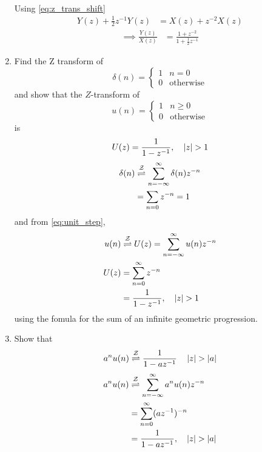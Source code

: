 \documentclass[journal,12pt,twocolumn]{IEEEtran}
\renewcommand\thesection{\arabic{section}}
\begin{document}
\begin{enumerate}[label=\thesection.\arabic*]
\begin{align}
\end{align}
Using \eqref{eq:z_trans_shift}
\begin{align}
  Y(z) + \frac{1}{2}z^{-1}Y(z) &= X(z)+z^{-2}X(z)
\end{align}
\begin{align}
\implies \frac{Y(z)}{X(z)} &= \frac{1 + z^{-2}}{1 + \frac{1}{2}z^{-1}}
\label{eq:freq_resp}
\end{align}
\item Find the Z transform of 
\begin{equation}
\delta(n)
=
\begin{cases}
1 & n = 0
\\
0 & \text{otherwise}
\end{cases}
\end{equation}
and show that the $Z$-transform of
\begin{equation}
\label{eq:unit_step}
u(n)
=
\begin{cases}
1 & n \ge 0
\\
0 & \text{otherwise}
\end{cases}
\end{equation}
is
\begin{equation}
U(z) = \frac{1}{1-z^{-1}}, \quad \left\vert z\right\vert > 1
\end{equation}
\solution 
\begin{align}
\delta(n) &\overset{\mathcal{Z}}{ \rightleftharpoons} \sum _{n=-\infty }^{\infty }\delta(n)z^{-n}\\
&= \sum _{n=0}z^{-n} = 1
\end{align}
and from \eqref{eq:unit_step},
\begin{align}
u(n) &\overset{\mathcal{Z}}{ \rightleftharpoons} U(z) = \sum _{n=-\infty }^{\infty }u(n)z^{-n}\\
U(z) &= \sum _{n= 0}^{\infty}z^{-n}\\
&=\frac{1}{1-z^{-1}}, \quad \left\vert z\right\vert > 1
\end{align}
using the fomula for the sum of an infinite geometric progression.
%
\item Show that 
\begin{equation}
\label{eq:anun}
a^nu(n) \overset{\mathcal{Z}}{ \rightleftharpoons} \frac{1}{1-az^{-1}} \quad \left\vert z\right\vert > \left\vert a\right\vert
\end{equation}
\solution
\begin{align}
  a^nu(n) &\overset{\mathcal{Z}}{ \rightleftharpoons} \sum _{n=-\infty }^{\infty }a^n u(n)z^{-n}\\
  &= \sum _{n=0 }^{\infty } (az^{-1})^{-n}\\
  &=\frac{1}{1-az^{-1}}, \quad \left\vert z\right\vert > \left\vert a\right\vert
\end{align}

\end{enumerate}
\end{document}
